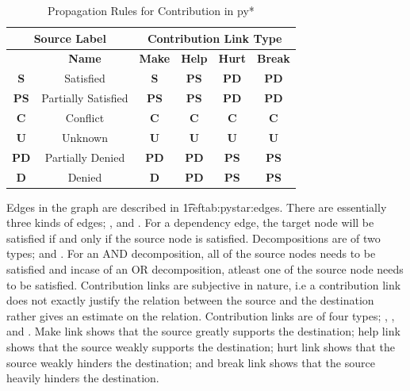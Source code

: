 \begin{table}[htpb]
\centering
\begin{tabular}{|c|c|c|c|c|c|}
\hline
\multicolumn{2}{|c|}{\textbf{Source Label}} & \multicolumn{4}{c|}{\textbf{Contribution Link Type}}           \\ \hline
\textbf{}        & \textbf{Name}            & \textbf{Make} & \textbf{Help} & \textbf{Hurt} & \textbf{Break} \\ \hline
\textbf{S}       & Satisfied                & \textbf{S}    & \textbf{PS}   & \textbf{PD}   & \textbf{PD}    \\ \hline
\textbf{PS}      & Partially Satisfied      & \textbf{PS}   & \textbf{PS}   & \textbf{PD}   & \textbf{PD}    \\ \hline
\textbf{C}       & Conflict                 & \textbf{C}    & \textbf{C}    & \textbf{C}    & \textbf{C}     \\ \hline
\textbf{U}       & Unknown                  & \textbf{U}    & \textbf{U}    & \textbf{U}    & \textbf{U}     \\ \hline
\textbf{PD}      & Partially Denied         & \textbf{PD}   & \textbf{PD}   & \textbf{PS}   & \textbf{PS}    \\ \hline
\textbf{D}       & Denied                   & \textbf{D}    & \textbf{PD}   & \textbf{PS}   & \textbf{PS}    \\ \hline
\end{tabular}
\caption{Propagation Rules for Contribution in py*}
\label{tab:pystar:props}
\end{table}

Edges in the graph are described in \t1ref{tab:pystar:edges}. There are essentially three kinds of edges; ,  and . For a dependency edge, the target node will be satisfied if and only if the source node is satisfied. Decompositions are of two types;  and . For an AND decomposition, all of the source nodes needs to be satisfied and incase of an OR decomposition, atleast one of the source node needs to be satisfied. Contribution links are subjective in nature, i.e a contribution link does not exactly justify the relation between the source and the destination rather gives an estimate on the relation. Contribution links are of four types; , ,  and . Make link shows that the source greatly supports the destination; help link shows that the source weakly supports the destination; hurt link shows that the source weakly hinders the destination; and break link shows that the source heavily hinders the destination.

